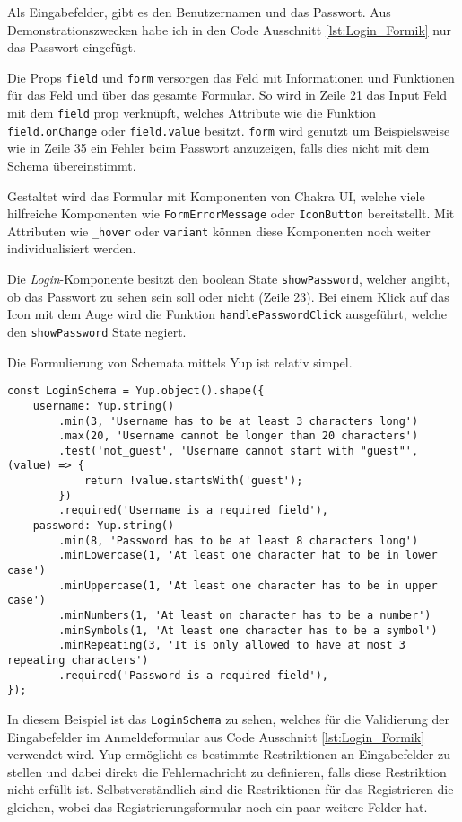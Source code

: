 Als Eingabefelder, gibt es  den Benutzernamen und das Passwort. Aus Demonstrationszwecken habe ich in den Code Ausschnitt \ref{lst:Login_Formik} nur das Passwort eingefügt.

Die Props \verb|field| und \verb|form| versorgen das Feld mit Informationen und Funktionen für das Feld und über das gesamte Formular. So wird in Zeile 21 das Input Feld mit dem \verb|field| prop verknüpft, welches Attribute wie die Funktion \verb|field.onChange| oder \verb|field.value| besitzt. \verb|form| wird genutzt um Beispielsweise wie in Zeile 35 ein Fehler beim Passwort anzuzeigen, falls dies nicht mit dem Schema übereinstimmt.

Gestaltet wird das Formular mit Komponenten von Chakra UI, welche viele hilfreiche Komponenten wie \verb|FormErrorMessage| oder \verb|IconButton| bereitstellt. Mit Attributen wie \verb|_hover| oder \verb|variant| können diese Komponenten noch weiter individualisiert werden.

Die \textit{Login}-Komponente besitzt den boolean State \verb|showPassword|, welcher angibt, ob das Passwort zu sehen sein soll oder nicht (Zeile 23). Bei einem Klick auf das Icon mit dem Auge wird die Funktion \verb|handlePasswordClick| ausgeführt, welche den \verb|showPassword| State negiert.

Die Formulierung von Schemata mittels Yup ist relativ simpel.

\begin{lstlisting}[style=codeStyle, caption={Yup Schma für das Anmelden}, label={lst:Yup-Login}]
const LoginSchema = Yup.object().shape({
    username: Yup.string()
        .min(3, 'Username has to be at least 3 characters long')
        .max(20, 'Username cannot be longer than 20 characters')
        .test('not_guest', 'Username cannot start with "guest"', (value) => {
            return !value.startsWith('guest');
        })
        .required('Username is a required field'),
    password: Yup.string()
        .min(8, 'Password has to be at least 8 characters long')
        .minLowercase(1, 'At least one character hat to be in lower case')
        .minUppercase(1, 'At least one character has to be in upper case')
        .minNumbers(1, 'At least on character has to be a number')
        .minSymbols(1, 'At least one character has to be a symbol')
        .minRepeating(3, 'It is only allowed to have at most 3 repeating characters')
        .required('Password is a required field'),
});
\end{lstlisting}

In diesem Beispiel ist das \verb|LoginSchema| zu sehen, welches für die Validierung der Eingabefelder im Anmeldeformular aus Code Ausschnitt \ref{lst:Login_Formik} verwendet wird. Yup ermöglicht es bestimmte Restriktionen an Eingabefelder zu stellen und dabei direkt die Fehlernachricht zu definieren, falls diese Restriktion nicht erfüllt ist. Selbstverständlich sind die Restriktionen für das Registrieren die gleichen, wobei das Registrierungsformular noch ein paar weitere Felder hat.

